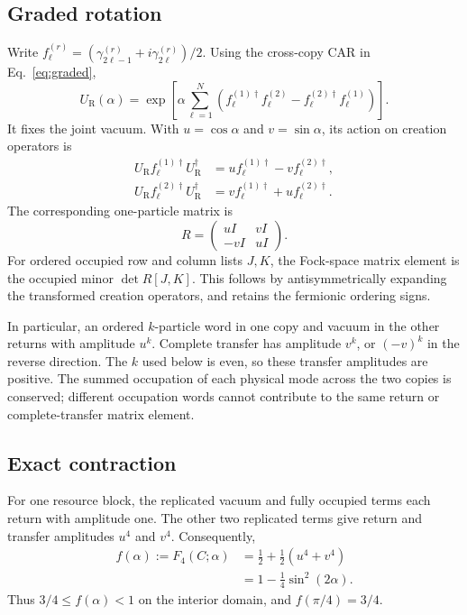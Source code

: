 \documentclass[aps,pra,reprint,amsmath,amssymb,longbibliography,floatfix]{revtex4-2}
\newcommand{\twist}{U_{\mathrm R}}
\newcommand{\Ftw}{F}
\begin{document}
\subsection{Graded rotation}

Write \(f_\ell^{(r)}
=(\gamma_{2\ell-1}^{(r)}+i\gamma_{2\ell}^{(r)})/2\).
Using the cross-copy CAR in Eq.~\eqref{eq:graded},
\begin{equation}
 \twist(\alpha)=\exp\!\left[\alpha\sum_{\ell=1}^N
 \left(f_\ell^{(1)\dagger}f_\ell^{(2)}
       -f_\ell^{(2)\dagger}f_\ell^{(1)}\right)\right].
 \label{eq:passive}
\end{equation}
It fixes the joint vacuum. With \(u=\cos\alpha\) and \(v=\sin\alpha\),
its action on creation operators is
\begin{align}
 \twist f_\ell^{(1)\dagger}\twist^\dagger
   &=u f_\ell^{(1)\dagger}-v f_\ell^{(2)\dagger},\nonumber\\
 \twist f_\ell^{(2)\dagger}\twist^\dagger
   &=v f_\ell^{(1)\dagger}+u f_\ell^{(2)\dagger}.
 \label{eq:creators}
\end{align}
The corresponding one-particle matrix is
\begin{equation}
 R=\begin{pmatrix}uI&vI\\-vI&uI\end{pmatrix}.
 \label{eq:R}
\end{equation}
For ordered occupied row and column lists \(J,K\), the Fock-space
matrix element is the occupied minor \(\det R[J,K]\).
This follows by antisymmetrically expanding the transformed creation
operators, and retains the fermionic ordering signs.

In particular, an ordered \(k\)-particle word in one copy and vacuum
in the other returns with amplitude \(u^k\).
Complete transfer has amplitude \(v^k\), or \((-v)^k\) in the reverse
direction. The \(k\) used below is even, so these transfer amplitudes
are positive. The summed occupation of each physical mode across
the two copies is conserved; different occupation words cannot
contribute to the same return or complete-transfer matrix element.

\subsection{Exact contraction}

For one resource block, the replicated vacuum and fully occupied
terms each return with amplitude one. The other two replicated terms
give return and transfer amplitudes \(u^4\) and \(v^4\).
Consequently,
\begin{align}
 f(\alpha):=\Ftw_4(C;\alpha)
   &=\frac12+\frac12(u^4+v^4)\nonumber\\
   &=1-\frac14\sin^2(2\alpha).
 \label{eq:f}
\end{align}
Thus \(3/4\leq f(\alpha)<1\) on the interior domain, and
\(f(\pi/4)=3/4\).
\end{document}
